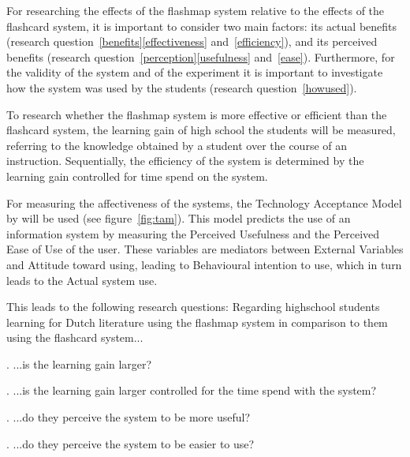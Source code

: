 
For researching the effects of the flashmap system relative to the effects of the flashcard system, it is important to consider two main factors: its actual benefits (research question~\ref{benefits}\ref{effectiveness} and~\ref{efficiency}), and its perceived benefits (research question~\ref{perception}\ref{usefulness} and~\ref{ease}). Furthermore, for the validity of the system and of the experiment it is important to investigate how the system was used by the students (research question~\ref{howused}).

To research whether the flashmap system is more effective or efficient than the flashcard system, the learning gain of high school the students will be measured, referring to the knowledge obtained by a student over the course of an instruction. Sequentially, the efficiency of the system is determined by the learning gain controlled for time spend on the system.

For measuring the affectiveness of the systems, the Technology Acceptance Model by  will be used (see figure~\ref{fig:tam}). This model predicts the use of an information system by measuring the Perceived Usefulness and the Perceived Ease of Use of the user. These variables are mediators between External Variables and Attitude toward using, leading to Behavioural intention to use, which in turn leads to the Actual system use.

This leads to the following research questions: Regarding highschool students learning for Dutch literature using the flashmap system in comparison to them using the flashcard system...

\label{benefits}
\label{effectiveness}
. ...is the learning gain larger?

\label{efficiency}
. ...is the learning gain larger controlled for the time spend with the system?

\label{perception}
\label{usefulness}
. ...do they perceive the system to be more useful?

\label{ease}
. ...do they perceive the system to be easier to use?

